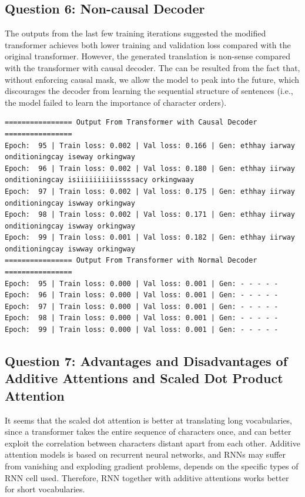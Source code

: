 \documentclass{article}
\begin{document}
\subsection{Question 6: Non-causal Decoder}
\par The outputs from the last few training iterations suggested the modified transformer achieves both lower training and validation loss compared with the original transformer. However, the generated translation is non-sense compared with the transformer with causal decoder. The can be resulted from the fact that, without enforcing causal mask, we allow the model to peak into the future, which discourages the decoder from learning the sequential structure of sentences (i.e., the model failed to learn the importance of character orders).
\begin{lstlisting}
================ Output From Transformer with Causal Decoder ================
Epoch:  95 | Train loss: 0.002 | Val loss: 0.166 | Gen: ethhay iarway onditioningcay iseway orkingway
Epoch:  96 | Train loss: 0.002 | Val loss: 0.180 | Gen: ethhay iirway onditioningcay isiiiiiiiiiissssacy orkingwaay
Epoch:  97 | Train loss: 0.002 | Val loss: 0.175 | Gen: ethhay iirway onditioningcay iswway orkingway
Epoch:  98 | Train loss: 0.002 | Val loss: 0.171 | Gen: ethhay iirway onditioningcay iswway orkingway
Epoch:  99 | Train loss: 0.001 | Val loss: 0.182 | Gen: ethhay iirway onditioningcay iswway orkingway
================ Output From Transformer with Normal Decoder ================
Epoch:  95 | Train loss: 0.000 | Val loss: 0.001 | Gen: - - - - -           
Epoch:  96 | Train loss: 0.000 | Val loss: 0.001 | Gen: - - - - -           
Epoch:  97 | Train loss: 0.000 | Val loss: 0.001 | Gen: - - - - -           
Epoch:  98 | Train loss: 0.000 | Val loss: 0.001 | Gen: - - - - -           
Epoch:  99 | Train loss: 0.000 | Val loss: 0.001 | Gen: - - - - -  
\end{lstlisting}
\subsection{Question 7: Advantages and Disadvantages of Additive Attentions and Scaled Dot Product Attention}
\par It seems that the scaled dot attention is better at translating long vocabularies, since a transformer takes the entire sequence of characters once, and can better exploit the correlation between characters distant apart from each other. Additive attention models is based on recurrent neural networks, and RNNs may suffer from vanishing and exploding gradient problems, depends on the specific types of RNN cell used. Therefore, RNN together with additive attentions works better for short vocabularies.
\end{document}
